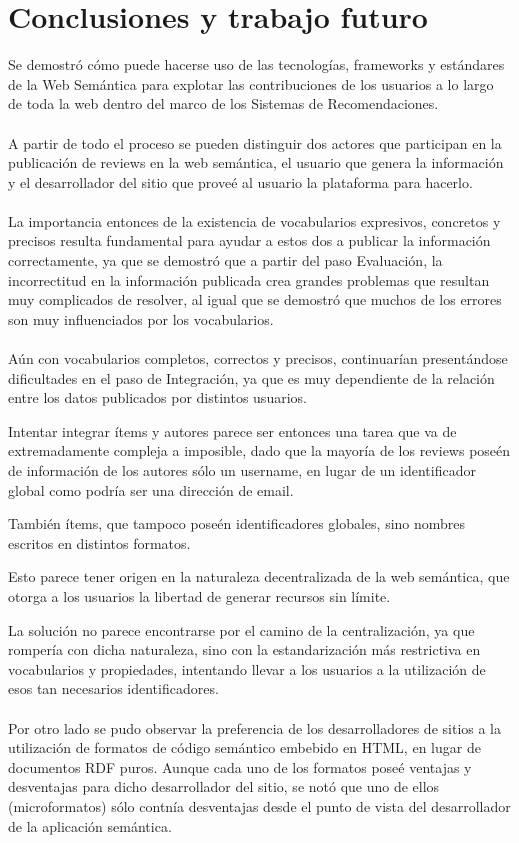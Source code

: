\chapter{Conclusiones y trabajo futuro}
\label{chapter:conclusiones}

Se demostró cómo puede hacerse uso de las tecnologías, frameworks y estándares de la Web 
Semántica para explotar las contribuciones de los usuarios a lo largo de toda la web dentro 
del marco de los Sistemas de Recomendaciones.
\\\\
A partir de todo el proceso se pueden distinguir dos actores que participan en la publicación 
de reviews en la web semántica, el usuario que genera la información y el desarrollador
del sitio que proveé al usuario la plataforma para hacerlo.
\\\\
La importancia entonces de la existencia de vocabularios expresivos, concretos y precisos 
resulta fundamental para ayudar a estos dos a publicar la información correctamente, ya que 
se demostró que a partir del paso Evaluación, la incorrectitud en la información publicada 
crea grandes problemas que resultan muy complicados de resolver, al igual que se demostró 
que muchos de los errores son muy influenciados por los vocabularios.
\\\\
Aún con vocabularios completos, correctos y precisos, continuarían presentándose dificultades en 
el paso de Integración, ya que es muy dependiente de la relación entre los datos publicados 
por distintos usuarios.

Intentar integrar ítems y autores parece ser entonces una tarea que va de extremadamente compleja 
a imposible, dado que la mayoría de los reviews poseén de información de los autores sólo un username, 
en lugar de un identificador global como podría ser una dirección de email.

También ítems, que tampoco poseén identificadores globales, sino nombres escritos en 
distintos formatos.

Esto parece tener origen en la naturaleza decentralizada de la web semántica, que otorga 
a los usuarios la libertad de generar recursos sin límite.

La solución no parece encontrarse por el camino de la centralización, ya que rompería con dicha 
naturaleza, sino con la estandarización más restrictiva en vocabularios y propiedades, intentando 
llevar a los usuarios a la utilización de esos tan necesarios identificadores.
\\\\
Por otro lado se pudo observar la preferencia de los desarrolladores de sitios a la utilización de 
formatos de código semántico embebido en HTML, en lugar de documentos RDF puros. Aunque cada uno de 
los formatos poseé ventajas y desventajas para dicho desarrollador del sitio, se notó que uno de ellos 
(microformatos) sólo contnía desventajas desde el punto de vista del desarrollador de la aplicación 
semántica. 

